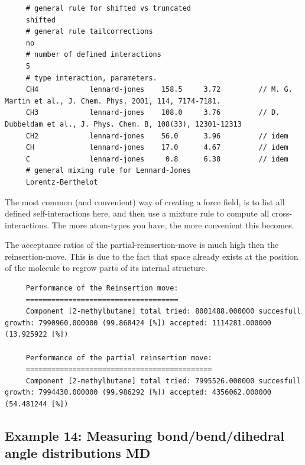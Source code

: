 \begin{tiny}
\begin{verbatim}
     # general rule for shifted vs truncated
     shifted
     # general rule tailcorrections
     no
     # number of defined interactions
     5
     # type interaction, parameters.
     CH4            lennard-jones    158.5     3.72         // M. G. Martin et al., J. Chem. Phys. 2001, 114, 7174-7181.
     CH3            lennard-jones    108.0     3.76         // D. Dubbeldam et al., J. Phys. Chem. B, 108(33), 12301-12313
     CH2            lennard-jones    56.0      3.96         // idem
     CH             lennard-jones    17.0      4.67         // idem
     C              lennard-jones     0.8      6.38         // idem
     # general mixing rule for Lennard-Jones
     Lorentz-Berthelot
\end{verbatim}
\end{tiny}
The most common (and convenient) way of creating a force field, is to list all defined self-interactions here, and then use a mixture rule to compute
all cross-interactions. The more atom-types you have, the more convenient this becomes.

The acceptance ratios of the partial-reinsertion-move is much high then the reinsertion-move.
This is due to the fact that space already exists at the position of the molecule to regrow parts of its internal structure.
\begin{tiny}
\begin{verbatim}
     Performance of the Reinsertion move:
     ====================================
     Component [2-methylbutane] total tried: 8001488.000000 succesfull growth: 7990960.000000 (99.868424 [%]) accepted: 1114281.000000 (13.925922 [%])
     
     Performance of the partial reinsertion move:
     ============================================
     Component [2-methylbutane] total tried: 7995526.000000 succesfull growth: 7994430.000000 (99.986292 [%]) accepted: 4356062.000000 (54.481244 [%])
\end{verbatim}
\end{tiny}

\subsection*{Example 14: Measuring bond/bend/dihedral angle distributions MD}

